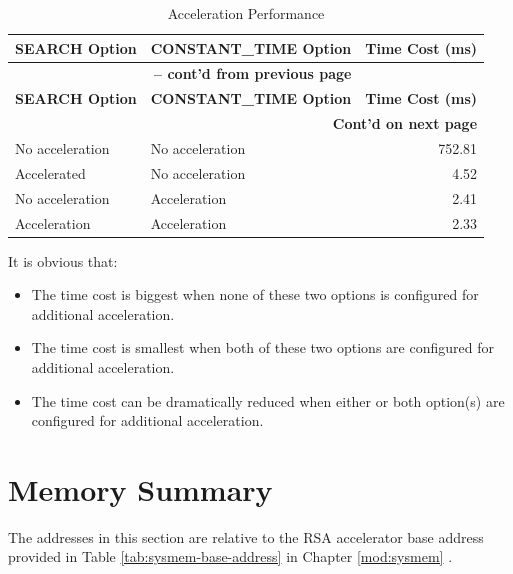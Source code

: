 \documentclass[main\_\_EN.tex]{subfiles}
\begin{document}
\begin{longtable}{ | l | l | r | }
    \caption{Acceleration Performance}\label{tab:accelerationeffect}
    \\\hline
    \rowcolor{lightgray}
        \textbf{SEARCH Option} & \textbf{CONSTANT\_TIME Option} & \textbf{Time Cost (ms)}  \\ \hline
        \endfirsthead
        \multicolumn{3}{c}{\bfseries \tablename\ \thetable{} -- cont'd from previous page}\\\hline
        
        \rowcolor{lightgray}
        \textbf{SEARCH Option} & \textbf{CONSTANT\_TIME Option} & \textbf{Time Cost (ms)}  \\ \hline
        \endhead
        
        \multicolumn{3}{r}{\textbf{Cont'd on next page}} \\
        \endfoot
        \endlastfoot
        \hline
    No acceleration & No acceleration & 752.81   \\ \hline    
    Accelerated & No acceleration & 4.52     \\ \hline
    No acceleration & Acceleration & 2.41     \\ \hline
    Acceleration & Acceleration & 2.33     \\ \hline
\end{longtable}

It is obvious that:
\begin{itemize}
    \item The time cost is biggest when none of these two options is configured for additional acceleration. 
    \item The time cost is smallest when both of these two options are configured for additional acceleration.
    \item The time cost can be dramatically reduced when either or both option(s) are configured for additional acceleration. 
\end{itemize}


\clearpage
\section{Memory Summary}\label{sec:mem-sum}
The addresses in this section are relative to the RSA accelerator base address provided in Table \ref{tab:sysmem-base-address} in Chapter \ref{mod:sysmem} \textit{}.
\end{document}

